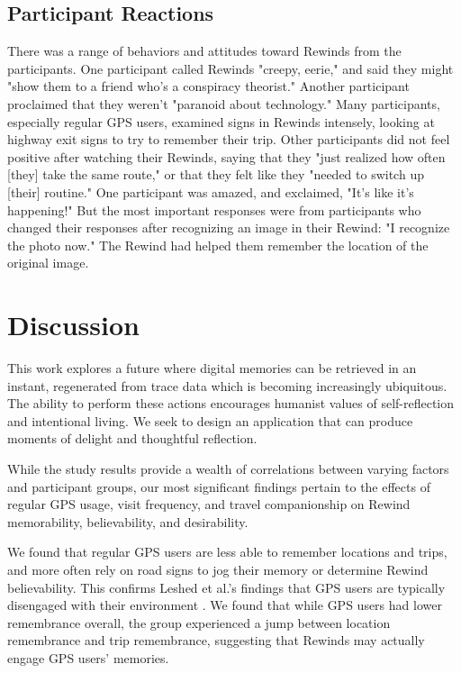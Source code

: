 \documentclass{sigchi}
\begin{document}
\subsection{Participant Reactions}
There was a range of behaviors and attitudes toward Rewinds from the participants. One participant called Rewinds "creepy, eerie," and said they might "show them to a friend who's a conspiracy theorist." Another participant proclaimed that they weren't "paranoid about technology." Many participants, especially regular GPS users, examined signs in Rewinds intensely, looking at highway exit signs to try to remember their trip. Other participants did not feel positive after watching their Rewinds, saying that they "just realized how often [they] take the same route," or that they felt like they "needed to switch up [their] routine." One participant was amazed, and exclaimed, "It's like it's happening!" But the most important responses were from participants who changed their responses after recognizing an image in their Rewind: "I recognize the photo now." The Rewind had helped them remember the location of the original image.

\section{Discussion}
This work explores a future where digital memories can be retrieved in an instant, regenerated from trace data which is becoming increasingly ubiquitous. The ability to perform these actions encourages humanist values of self-reflection and intentional living. We seek to design an application that can produce moments of delight and thoughtful reflection.

While the study results provide a wealth of correlations between varying factors and participant groups, our most significant findings pertain to the effects of regular GPS usage, visit frequency, and travel companionship on Rewind memorability, believability, and desirability. 

We found that regular GPS users are less able to remember locations and trips, and more often rely on road signs to jog their memory or determine Rewind believability. This confirms Leshed et al.'s findings that GPS users are typically disengaged with their environment \cite{leshed2008car}. We found that while GPS users had lower remembrance overall, the group experienced a jump between location remembrance and trip remembrance, suggesting that Rewinds may actually engage GPS users' memories. 
\end{document}
